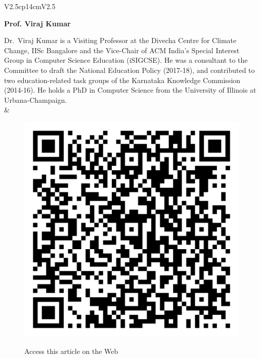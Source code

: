 \begin{tabular}{V{2.5}cp{14cm}V{2.5}}
\centerline{\large\bf Prof. Viraj Kumar}

\bigskip
Dr.~Viraj Kumar is a Visiting Professor at the Divecha Centre for Climate Change, IISc Bangalore and the Vice-Chair of ACM India’s Special Interest Group in Computer Science Education (iSIGCSE). He was a consultant to the Committee to draft the National Education Policy (2017-18), and contributed to two education-related task groups of the Karnataka Knowledge Commission (2014-16). He holds a PhD in Computer Science from the University of Illinois at Urbana-Champaign.\\
&\\
\end{tabular}

\vskip 1cm

\begin{figure}[H]
\centering
\includegraphics[scale=.15]{src/Figures/QR-codes/qr-code_experiential-learning.png}

\medskip

{\large\sf Access this article on the Web}
\end{figure}

